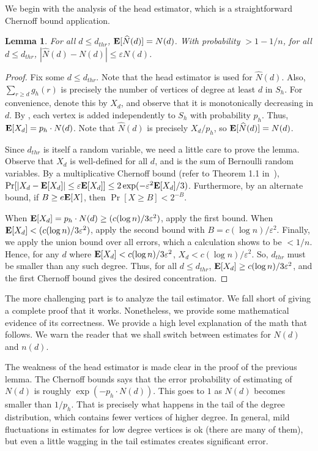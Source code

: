 \documentclass[11pt]{article}
\newtheorem{lemma}[theorem]{Lemma}
\theoremstyle{definition}
\newcommand{\EX}{\hbox{\bf E}}
\def\eps{\varepsilon}
\newcommand{\hN}{\widehat{N}}
\begin{document}
\medskip

We begin with the analysis of the head estimator, which is a straightforward Chernoff bound application.

\begin{lemma} \label{lem:head} For all $d \leq d_{thr}$, $\EX[\hN(d)] = N(d)$.
With probability $> 1 - 1/n$, for all $d \leq d_{thr}$, $|\hN(d) - N(d)| \leq \eps N(d)$.
\end{lemma}

\begin{proof} Fix some $d \leq d_{thr}$. Note that the head estimator
is used for $\hN(d)$. Also, $\sum_{r \geq d} g_h(r)$ is precisely the number of vertices of degree at least $d$ in $S_h$.
For convenience, denote this by $X_d$, and observe that it is monotonically decreasing in $d$.
By , each vertex is added independently to $S_h$ with probability $p_h$.
Thus, $\EX[X_d] = p_h \cdot N(d)$.
Note that $\hN(d)$ is precisely $X_d/p_h$, so $\EX[\hN(d)] = N(d)$.

Since $d_{thr}$ is itself a random variable, we need a little care to prove the lemma.
Observe that $X_d$ is well-defined for all $d$, and is the sum of Bernoulli random
variables. By a multiplicative Chernoff bound (refer to Theorem 1.1 in~\cite{DuPa}), $\Pr[|X_d - \EX[X_d]| \leq \eps \EX[X_d]] \leq 2\exp(-\eps^2 \EX[X_d]/3)$.
Furthermore, by an alternate bound, if $B \geq e\EX[X]$, then $\Pr[X \geq B] < 2^{-B}$.

When $\EX[X_d] = p_h \cdot N(d) \geq (c(\log n)/3\eps^2)$, apply the first bound.
When $\EX[X_d] < (c(\log n)/3\eps^2)$, apply the second bound with $B = c(\log n)/\eps^2$.
Finally, we apply the union bound over all errors, which a calculation shows to be $< 1/n$.
Hence, for any $d$ where $\EX[X_d] < c(\log n)/3\eps^2$, $X_d < c(\log n)/\eps^2$.
So, $d_{thr}$ must be smaller than any such degree. Thus, for all $d \leq d_{thr}$,
$\EX[X_d] \geq c(\log n)/3\eps^2$, and the first Chernoff bound gives the desired
concentration.
\end{proof}

The more challenging part is to analyze the tail estimator. We fall short of giving a complete
proof that it works. Nonetheless, we provide
some mathematical evidence of its correctness. We provide a high level explanation
of the math that follows. We warn the reader that we shall switch between estimates for $N(d)$
and $n(d)$.

The weakness of the head estimator is made clear in the proof of the previous lemma.
The Chernoff bounds says that the error probability of estimating of $N(d)$ is roughly $\exp(-p_h\cdot N(d))$.
This goes to $1$ as $N(d)$ becomes smaller than $1/p_h$. That is precisely what happens
in the tail of the degree distribution, which contains fewer vertices of higher degree.
In general, mild fluctuations in estimates for low degree vertices is ok (there are many of them),
but even a little wagging in the tail estimates creates significant error.
\end{document}
